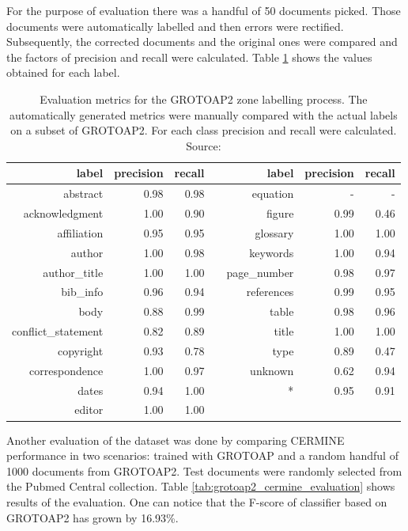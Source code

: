 \quad
For the purpose of evaluation there was a handful of 50 documents picked. Those documents were automatically labelled and then errors were rectified. Subsequently, the corrected documents and the original ones were compared and the factors of precision and recall were calculated. Table \ref{tab:grotoap2_evaluation} shows the values obtained for each label.

\begin{table}
\centering
\begin{tabular}{@{}rrrcrrr@{}}
 \toprule
label & precision & recall & \phantom{abc} & label & precision & recall\\ \midrule
abstract & 0.98 & 0.98 && equation & - & - \\ 
acknowledgment & 1.00 & 0.90 && figure & 0.99 & 0.46 \\ 
affiliation & 0.95 & 0.95 && glossary & 1.00 & 1.00 \\ 
author & 1.00 & 0.98 && keywords & 1.00 & 0.94 \\ 
author\_title & 1.00 & 1.00 && page\_number & 0.98 & 0.97 \\ 
bib\_info & 0.96 & 0.94 && references & 0.99 & 0.95 \\ 
body & 0.88 & 0.99 && table & 0.98 & 0.96 \\ 
conflict\_statement & 0.82 & 0.89 && title & 1.00 & 1.00 \\ 
copyright & 0.93 & 0.78 && type & 0.89 & 0.47 \\ 
correspondence & 1.00 & 0.97 && unknown & 0.62 & 0.94 \\ 
dates & 0.94 & 1.00 && * & 0.95 & 0.91 \\ 
editor & 1.00 & 1.00 &&   &      &       \\
\bottomrule
\end{tabular}
\caption{Evaluation metrics for the GROTOAP2 zone labelling process. The automatically generated metrics were manually compared with the actual labels on a subset of GROTOAP2. For each class precision and recall were calculated. Source: \cite{DominikaTkaczykPaweSzostek2014}}
\label{tab:grotoap2_evaluation}
\end{table}

Another evaluation of the dataset was done by comparing CERMINE performance in two scenarios: trained with GROTOAP and a random handful of 1000 documents from GROTOAP2. Test documents were randomly selected from the Pubmed Central collection. Table \ref{tab:grotoap2_cermine_evaluation} shows results of the evaluation. One can notice that the F-score of classifier based on GROTOAP2 has grown by 16.93\%.


